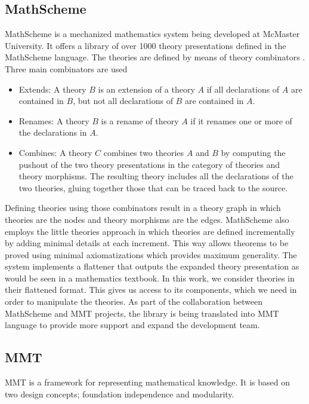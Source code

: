 \subsection{MathScheme}
\label{sec:MathScheme}
MathScheme \cite{Carette2011} is a mechanized mathematics system being developed at McMaster University. It offers a library of over 1000 theory presentations \cite{carette2011mathscheme, zhang2009language} defined in the MathScheme language. The theories are defined by means of theory combinators \cite{carette2012theory}. Three main combinators are used 
\begin{itemize}
	\item Extends: A theory $B$ is an extension of a theory $A$ if all declarations of $A$ are contained in $B$, but not all declarations of $B$ are contained in $A$. 
	\item Renames: A theory $B$ is a rename of theory $A$ if it renames one or more of the declarations in $A$. 
	\item Combines: A theory $C$ combines two theories $A$ and $B$ by computing the pushout of the 
	two theory presentations in the category of theories and theory morphisms. The resulting theory 
	includes all the declarations of the two theories, gluing together those that can be traced back to 
	the source. 
\end{itemize} 
Defining theories using those combinators result in a theory graph in which theories are the nodes 
and theory morphisms are the edges. MathScheme also employs the little 
theories approach \cite{farmer1992little} in which theories are defined incrementally by adding 
minimal details at each increment. This way allows theorems to be proved using minimal 
axiomatizations which provides maximum generality. 
The system implements a flattener that outputs the expanded theory presentation as would be seen in a mathematics textbook. In this work, we consider theories in their flattened format. This gives us access to its components, which we need in order to manipulate the theories. As part of the collaboration between MathScheme and MMT projects, the library is being translated into MMT language to provide more support and expand the development team. 


\subsection{MMT}
\label{sec:MMT}
MMT \cite{MMT_homepage}
is a framework for representing mathematical knowledge. It is based on two design concepts; foundation independence and modularity. 

